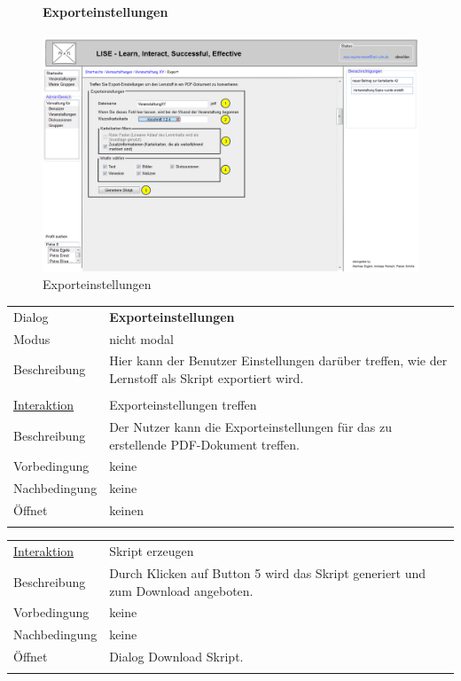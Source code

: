 \documentclass[12pt,a4paper]{article}
\begin{document}
{\begin{figure}[H]
	\centering
	\paragraph{Exporteinstellungen}
	\includegraphics[width=\textwidth]{Bilder/Mockups/GUI/Exporteinstellungen.png}
	\caption{Exporteinstellungen}
	\label{GuiExporteinstellungen}
\end{figure}
\begin{tabular}{l p{12cm}}
	Dialog 	 & \textbf{Exporteinstellungen} \\ 
	Modus & nicht modal\\ 
	Beschreibung   	& Hier kann der Benutzer Einstellungen darüber treffen, wie der Lernstoff als Skript exportiert wird. \\\\
	
	\underline{Interaktion} 	 & Exporteinstellungen treffen\\ 
	Beschreibung   	& Der Nutzer kann die Exporteinstellungen für das zu erstellende PDF-Dokument treffen.\\
	Vorbedingung	& keine \\
	Nachbedingung	& keine \\
	Öffnet			& keinen\\\\
\end{tabular}

\begin{tabular}{l p{12cm}}
	\underline{Interaktion} 	 & Skript erzeugen\\ 
	Beschreibung   	& Durch Klicken auf Button 5 wird das Skript generiert und zum Download angeboten.\\
	Vorbedingung	& keine \\
	Nachbedingung	& keine \\
	Öffnet			& Dialog \glqq Download Skript\grqq.\\\\
\end{tabular}

}
\end{document}
